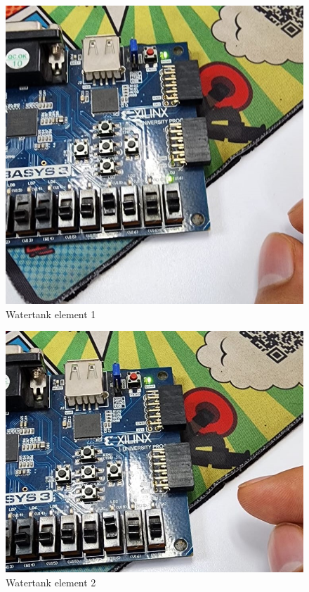 \documentclass{article}
\begin{document}
\begin{multicols}{2}
	\begin{figure}[H]
		\centering
		\includegraphics[width=0.8\linewidth]{images/diagrams/watertank/watertank1.jpg}
		\caption{Watertank element 1}
		\label{Watertank element 1 Apendix}
	\end{figure}

	\begin{figure}[H]
		\centering
		\includegraphics[width=0.8\linewidth]{images/diagrams/watertank/watertank2.jpg}
		\caption{Watertank element 2}
		\label{Watertank element 2 Apendix}
	\end{figure}


\end{multicols}
\end{document}
